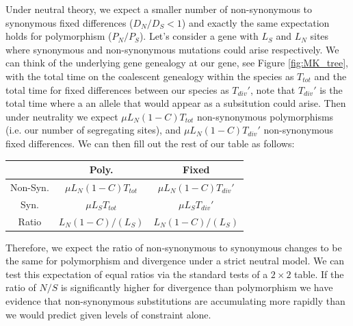 Under neutral theory, we expect a smaller number of non-synonymous to
synonymous fixed differences ($D_N/D_S < 1$) and exactly the same
expectation holds for polymorphism ($P_N/P_S$). Let's consider a gene with $L_S$ and $L_N$ sites where synonymous and non-synonymous mutations could arise respectively.
We can think of the underlying gene genealogy at our gene, see Figure
\ref{fig:MK_tree}, with the total time on the coalescent genealogy
within the species as $T_{tot}$ and the total time for fixed
differences between our species as $T_{div}'$, note that $T_{div}'$ is
the total time where a an allele that would appear as a subsitution
could arise. Then under neutrality we expect $ \mu L_N (1-C) T_{tot}$
non-synonymous polymorphisms (i.e. our number of segregating sites), and  $ \mu L_N (1-C) T_{div}'$ non-synonymous fixed differences.
We can then fill out the rest of our table as follows:

\begin{center}
\begin{tabular}{ccc}
 & Poly. & Fixed  \\
 \hline
Non-Syn. &    $\mu L_N (1-C) T_{tot}$  &   $\mu L_N (1-C)  T_{div}'$ \\
Syn. &    $\mu L_S T_{tot}$   &     $\mu L_S T_{div}'$  \\
Ratio & $ L_N(1-C)/( L_S)$  & $ L_N (1-C) / ( L_S)$
\end{tabular}
\end{center}
Therefore, we expect the ratio of non-synonymous to synonymous changes to be the same for polymorphism and divergence under a strict neutral model. We can test this expectation of equal ratios via the standard tests of a $2
\times 2$ table. If the ratio of $N/S$ is significantly higher for divergence than polymorphism we have evidence that non-synonymous substitutions are accumulating more rapidly than we would predict given levels of constraint alone.



